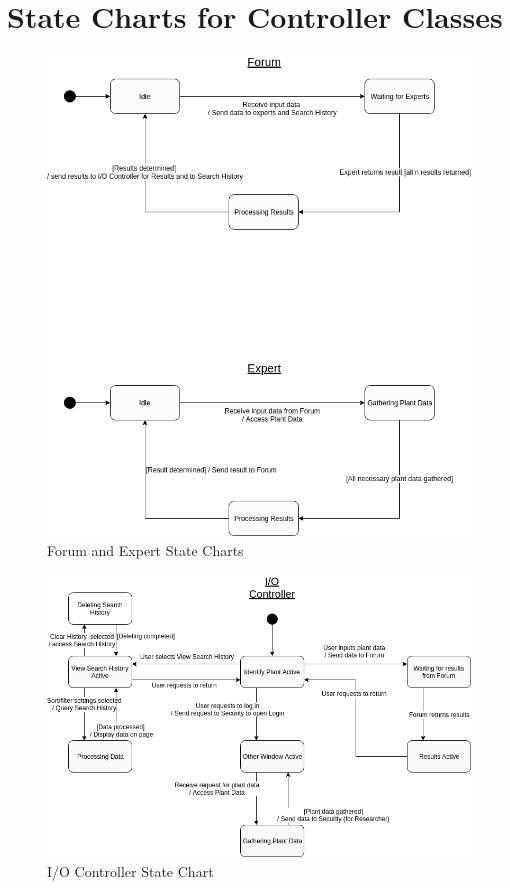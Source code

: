 \documentclass[]{article}
\begin{document}

\newpage
\section{State Charts for Controller Classes}
\label{sec:state_charts_for_controller_classes}
\begin{figure}[!hb]
      \includegraphics[width=\linewidth]{ForumExpert.png}
      \caption{Forum and Expert State Charts}
      \label{fig:FEState}
\end{figure}

\begin{figure}[!hb]
      \includegraphics[width=\linewidth]{IOController.png}
      \caption{I/O Controller State Chart}
      \label{fig:IOState}
\end{figure}
\end{document}
